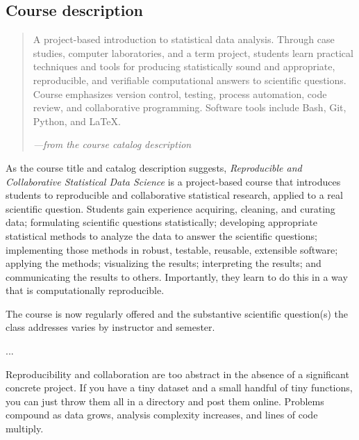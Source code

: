 \subsection{Course description}

\begin{quote}
A project-based introduction to statistical data analysis. Through case
studies, computer laboratories, and a term project, students learn
practical techniques and tools for producing statistically sound and
appropriate, reproducible, and verifiable computational answers to
scientific questions. Course emphasizes version control, testing,
process automation, code review, and collaborative programming.
Software tools include Bash, Git, Python, and \LaTeX.

\hfill\emph{---from the course catalog description}
\end{quote}

As the course title and catalog description suggests, \emph{Reproducible and
Collaborative Statistical Data Science} is a project-based course that
introduces students to reproducible and collaborative statistical research,
applied to a real scientific question.
Students gain experience acquiring, cleaning, and curating data; formulating
scientific questions statistically; developing appropriate statistical methods
to analyze the data to answer the scientific questions; implementing those
methods in robust, testable, reusable, extensible software; applying the
methods; visualizing the results; interpreting the results; and communicating
the results to others. Importantly, they learn to do this in a way that is
computationally reproducible.

The course is now regularly offered and the substantive scientific question(s)
the class addresses varies by instructor and semester.

...

Reproducibility and collaboration are too abstract in the absence of a
significant concrete project.
If you have a tiny dataset and a small handful of tiny functions, you can
just throw them all in a directory and post them online.
Problems compound as data grows, analysis complexity increases,
and lines of code multiply.

